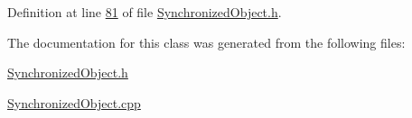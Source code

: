 Definition at line \hyperlink{_synchronized_object_8h_source_l00081}{81} of file \hyperlink{_synchronized_object_8h_source}{Synchronized\+Object.\+h}.



The documentation for this class was generated from the following files\+:\begin{DoxyCompactItemize}
\item 
\hyperlink{_synchronized_object_8h}{Synchronized\+Object.\+h}\item 
\hyperlink{_synchronized_object_8cpp}{Synchronized\+Object.\+cpp}\end{DoxyCompactItemize}
